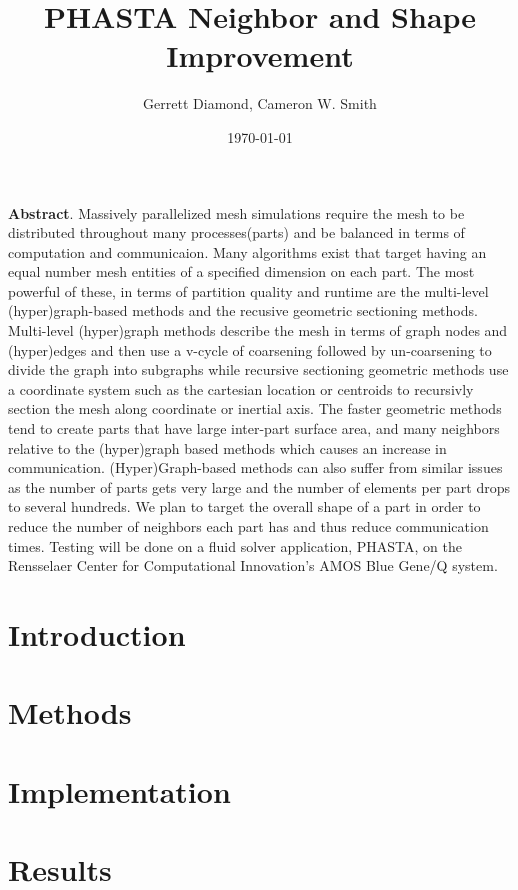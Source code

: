 \documentclass[a4paper]{article}
\title{PHASTA Neighbor and Shape Improvement}
\author{Gerrett Diamond, Cameron W. Smith}
\date{\today}
\begin{document}
\maketitle

\textbf{Abstract}. Massively parallelized mesh simulations require the mesh to be distributed throughout many processes(parts) and be balanced in terms of computation and communicaion. Many algorithms exist that target having an equal number mesh entities of a specified dimension on each part. The most powerful of these, in terms of partition quality and runtime are the multi-level (hyper)graph-based methods and the recusive geometric sectioning methods.  Multi-level (hyper)graph methods describe the mesh in terms of graph nodes and (hyper)edges and then use a v-cycle of coarsening followed by un-coarsening to divide the graph into subgraphs while recursive sectioning geometric methods use a coordinate system such as the cartesian location or centroids to recursivly section the mesh along coordinate or inertial axis. The faster geometric methods tend to create parts that have large inter-part surface area, and many neighbors relative to the (hyper)graph based methods which causes an increase in communication. (Hyper)Graph-based methods can also suffer from similar issues as the number of parts gets very large and the number of elements per part drops to several hundreds.  We plan to target the overall shape of a part in order to reduce the number of neighbors each part has and thus reduce communication times. Testing will be done on a fluid solver application, PHASTA, on the Rensselaer Center for Computational Innovation's AMOS Blue Gene/Q system.
 
\section{Introduction}

\section{Methods}


\section{Implementation}

\section{Results}

\newpage


\end{document}
